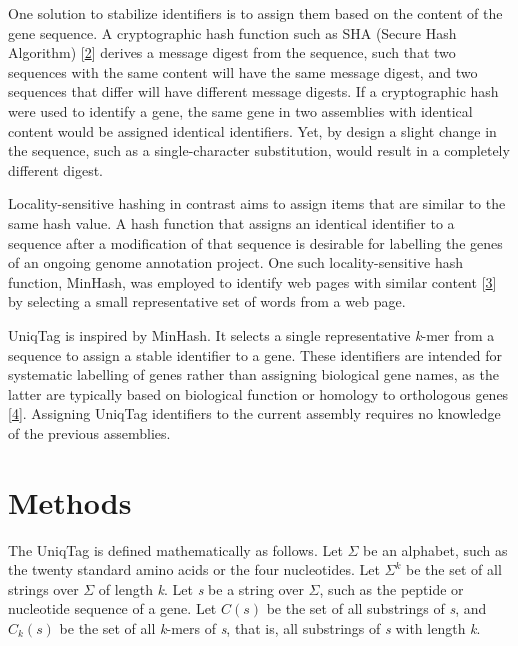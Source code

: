 \documentclass[10pt]{article}
\begin{document}
One solution to stabilize identifiers is to assign them based on the
content of the gene sequence. A cryptographic hash function such as SHA
(Secure Hash Algorithm)
{[}\href{http://www.nist.gov/manuscript-publication-search.cfm?pub_id=910977}{2}{]}
derives a message digest from the sequence, such that two sequences with
the same content will have the same message digest, and two sequences
that differ will have different message digests. If a cryptographic hash
were used to identify a gene, the same gene in two assemblies with
identical content would be assigned identical identifiers. Yet, by
design a slight change in the sequence, such as a single-character
substitution, would result in a completely different digest.

Locality-sensitive hashing in contrast aims to assign items that are
similar to the same hash value. A hash function that assigns an
identical identifier to a sequence after a modification of that sequence
is desirable for labelling the genes of an ongoing genome annotation
project. One such locality-sensitive hash function, MinHash, was
employed to identify web pages with similar content
{[}\href{http://dx.doi.org/10.1109/SEQUEN.1997.666900}{3}{]} by
selecting a small representative set of words from a web page.

UniqTag is inspired by MinHash. It selects a single representative
\emph{k}-mer from a sequence to assign a stable identifier to a gene.
These identifiers are intended for systematic labelling of genes rather
than assigning biological gene names, as the latter are typically based
on biological function or homology to orthologous genes
{[}\href{http://dx.doi.org/10.1006/geno.2002.6748}{4}{]}. Assigning
UniqTag identifiers to the current assembly requires no knowledge of the
previous assemblies.

\section{Methods}\label{methods}

The UniqTag is defined mathematically as follows. Let \(\Sigma\) be an
alphabet, such as the twenty standard amino acids or the four
nucleotides. Let \(\Sigma^k\) be the set of all strings over \(\Sigma\)
of length \emph{k}. Let \emph{s} be a string over \(\Sigma\), such as
the peptide or nucleotide sequence of a gene. Let \(C(s)\) be the set of
all substrings of \emph{s}, and \(C_k(s)\) be the set of all
\emph{k}-mers of \emph{s}, that is, all substrings of \emph{s} with
length \emph{k}.
\end{document}
